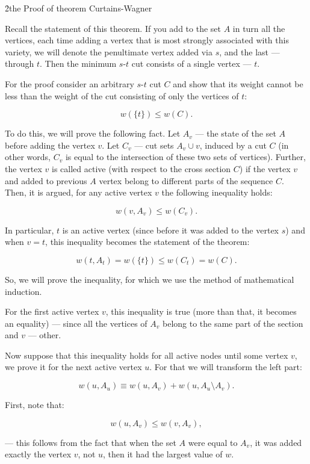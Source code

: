\h2{the Proof of theorem Curtains-Wagner}

Recall the statement of this theorem. If you add to the set $A$ in turn all the vertices, each time adding a vertex that is most strongly associated with this variety, we will denote the penultimate vertex added via $s$, and the last --- through $t$. Then the minimum $s$-$t$ cut consists of a single vertex --- $t$.

For the proof consider an arbitrary $s$-$t$ cut $C$ and show that its weight cannot be less than the weight of the cut consisting of only the vertices of $t$:

$$ w(\{t\}) \le w(C). $$

To do this, we will prove the following fact. Let $A_v$ --- the state of the set $A$ before adding the vertex $v$. Let $C_v$ --- cut sets $A_v \cup v$, induced by a cut $C$ (in other words, $C_v$ is equal to the intersection of these two sets of vertices). Further, the vertex $v$ is called active (with respect to the cross section $C$) if the vertex $v$ and added to previous $A$ vertex belong to different parts of the sequence $C$. Then, it is argued, for any active vertex $v$ the following inequality holds:

$$ w(v,A_v) \le w(C_v). $$

In particular, $t$ is an active vertex (since before it was added to the vertex $s$) and when $v = t$, this inequality becomes the statement of the theorem:

$$ w(t,A_t) = w(\{t\}) \le w(C_t) = w(C). $$

So, we will prove the inequality, for which we use the method of mathematical induction.

For the first active vertex $v$, this inequality is true (more than that, it becomes an equality) --- since all the vertices of $A_v$ belong to the same part of the section and $v$ --- other.

Now suppose that this inequality holds for all active nodes until some vertex $v$, we prove it for the next active vertex $u$. For that we will transform the left part:

$$ w(u,A_u) \equiv w(u,A_v) + w(u,A_u \setminus A_v). $$

First, note that:

$$ w(u,A_v) \le w(v,A_v), $$

--- this follows from the fact that when the set $A$ were equal to $A_v$, it was added exactly the vertex $v$, not $u$, then it had the largest value of $w$.

